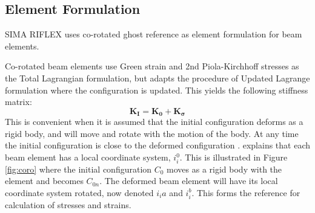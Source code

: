 \subsection{Element Formulation}
\label{sec:ghost}
SIMA RIFLEX uses co-rotated ghost reference as element formulation for beam elements. 

Co-rotated beam elements use Green strain and 2nd
Piola-Kirchhoff stresses as the Total Lagrangian formulation, but adapts the procedure of Updated Lagrange formulation where the configuration is updated. This yields the following stiffness matrix:
\begin{equation}
    \boldsymbol{K_I}= \boldsymbol{K_0} + \boldsymbol{K_\sigma}
\end{equation}
This is convenient when it is assumed that the initial configuration deforms as a rigid body, and will move and rotate with the motion of the body. At any time the initial configuration is close to the deformed configuration \cite{sintef2017}. \cite{Mathisen1990} explains that each beam element has a local coordinate system, $i_i^0$. This is illustrated in Figure \ref{fig:coro} where the initial configuration $C_0$ moves as a rigid body with the element and becomes $C_{0n}$. The deformed beam element will have its local coordinate system rotated, now denoted $i_ia$ and $i_i^b$. This forms the reference for calculation of stresses and strains. 

